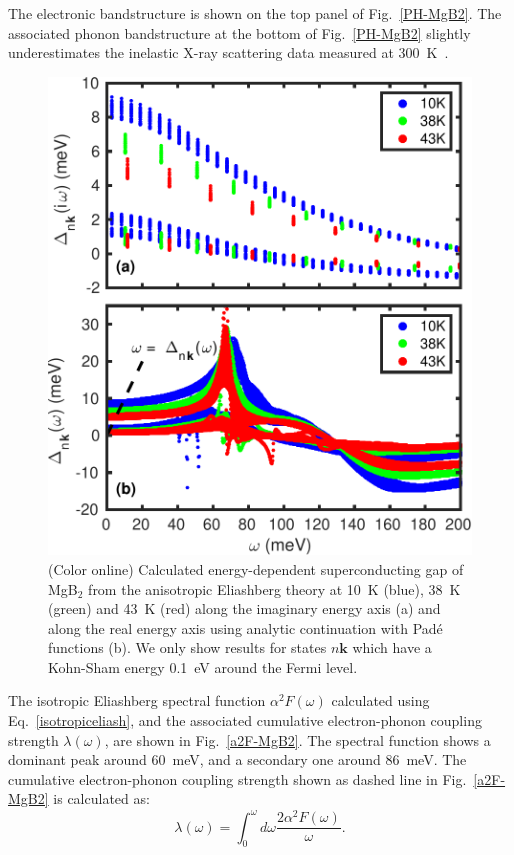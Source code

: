 \documentclass[final,3p,times,twocolumn]{elsarticle}
\begin{document}
The electronic bandstructure is shown on the top panel of Fig.~\ref{PH-MgB2}.
The associated phonon bandstructure at the bottom of Fig.~\ref{PH-MgB2} slightly underestimates the inelastic X-ray scattering data measured at 300~K~\cite{Shukla2003}.


\begin{figure}[b!]
  \centering
  \includegraphics[width=0.99\linewidth]{MgB2_aniso2.pdf}
  \caption{\label{aniso-MgB2} (Color online) Calculated energy-dependent superconducting gap of MgB$_2$ from the anisotropic Eliashberg theory at 10~K (blue), 38~K (green) and 43~K (red) along the imaginary energy axis (a) and along the real energy axis using analytic continuation with Pad\'e functions (b). We only show results for states $n\mathbf{k}$ which have a Kohn-Sham energy 0.1~eV around the Fermi level.  }
\end{figure}

The isotropic Eliashberg spectral function $\alpha^2 F(\omega)$ calculated using Eq.~\eqref{isotropiceliash}, and the associated cumulative electron-phonon coupling strength $\lambda(\omega)$, are shown in Fig.~\ref{a2F-MgB2}.
The spectral function shows a dominant peak around 60~meV, and a secondary one around 86~meV.
The cumulative electron-phonon coupling strength shown as dashed line in Fig.~\ref{a2F-MgB2} is calculated as: 
\begin{equation}
\lambda(\omega) = \int_0^\omega d\omega \frac{2\alpha^2F(\omega)}{\omega}.
\end{equation}
\end{document}
